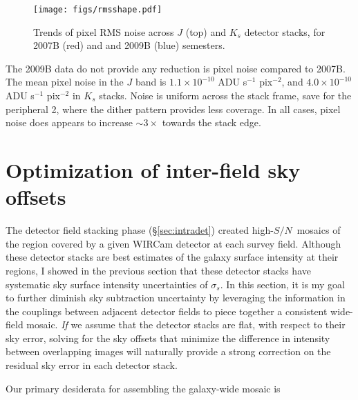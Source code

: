 \documentclass[iop]{emulateapj}
\newcommand{\sn}{\ensuremath{S/N}} %
\begin{document}
\begin{figure}[p]
	\centering
		\texttt{[image: figs/rmsshape.pdf]}
	\caption[Trends of pixel RMS noise across $J$ and $K_s$ detector stacks]{Trends of pixel RMS noise across $J$ (top) and $K_s$ detector stacks, for 2007B (red) and and 2009B (blue) semesters.}
	\label{fig:rmsshape}
\end{figure}

The 2009B data do not provide any reduction is pixel noise compared to 2007B. The mean pixel noise in the $J$ band is $1.1\times 10^{-10}$ ADU s$^{-1}$ pix$^{-2}$, and $4.0\times10^{-10}$ ADU s$^{-1}$ pix$^{-2}$ in $K_s$ stacks. Noise is uniform across the stack frame, save for the peripheral 2\arcmin, where the dither pattern provides less coverage. In all cases, pixel noise does appears to increase  $\sim 3\times$ towards the stack edge.

\section{Optimization of inter-field sky offsets}
\label{sec:interdet}

The detector field stacking phase (\S \ref{sec:intradet}) created high-\sn\ mosaics of the region covered by a given WIRCam detector at each survey field. Although these detector stacks are best estimates of the galaxy surface intensity at their regions, I showed in the previous section that these detector stacks have systematic sky surface intensity uncertainties of $\sigma_s$. In this section, it is my goal to further diminish sky subtraction uncertainty by leveraging the information in the couplings between adjacent detector fields to piece together a consistent wide-field mosaic. \emph{If} we assume that the detector stacks are flat, with respect to their sky error, solving for the sky offsets that minimize the difference in intensity between overlapping images will naturally provide a strong correction on the residual sky error in each detector stack.

Our primary desiderata for assembling the galaxy-wide mosaic is
\end{document}
